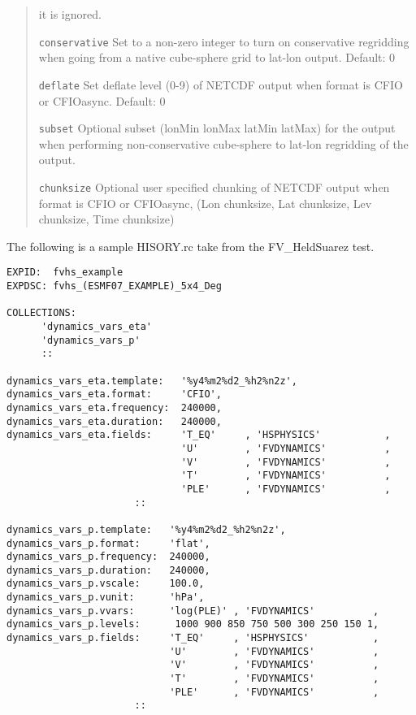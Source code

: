 \begin{quote}
\begin{trivlist}
                         it is ignored.
\item[\tt conservative]  Set to a non-zero integer to turn on conservative regridding when going
                         from a native cube-sphere grid to lat-lon output.
                         Default: 0
\item[\tt deflate]       Set deflate level (0-9) of NETCDF output when format is CFIO or CFIOasync.
                         Default: 0
\item[\tt subset]        Optional subset (lonMin lonMax latMin latMax) for the output when performing
                         non-conservative cube-sphere to lat-lon regridding of the output.
\item[\tt chunksize]     Optional user specified chunking of NETCDF output when format is CFIO or CFIOasync, 
                         (Lon chunksize, Lat chunksize, Lev chunksize, Time chunksize)
\end{trivlist}
\end{quote}

The following is a sample HISORY.rc take from the FV\_HeldSuarez test.
\begin{verbatim}
EXPID:  fvhs_example
EXPDSC: fvhs_(ESMF07_EXAMPLE)_5x4_Deg

COLLECTIONS:
      'dynamics_vars_eta'
      'dynamics_vars_p'
      ::

dynamics_vars_eta.template:   '%y4%m2%d2_%h2%n2z',
dynamics_vars_eta.format:     'CFIO',
dynamics_vars_eta.frequency:  240000,
dynamics_vars_eta.duration:   240000,
dynamics_vars_eta.fields:     'T_EQ'     , 'HSPHYSICS'           ,
                              'U'        , 'FVDYNAMICS'          ,
                              'V'        , 'FVDYNAMICS'          ,
                              'T'        , 'FVDYNAMICS'          ,
                              'PLE'      , 'FVDYNAMICS'          ,
                      ::

dynamics_vars_p.template:   '%y4%m2%d2_%h2%n2z',
dynamics_vars_p.format:     'flat',
dynamics_vars_p.frequency:  240000,
dynamics_vars_p.duration:   240000,
dynamics_vars_p.vscale:     100.0,
dynamics_vars_p.vunit:      'hPa',
dynamics_vars_p.vvars:      'log(PLE)' , 'FVDYNAMICS'          ,   
dynamics_vars_p.levels:      1000 900 850 750 500 300 250 150 1,
dynamics_vars_p.fields:     'T_EQ'     , 'HSPHYSICS'           ,
                            'U'        , 'FVDYNAMICS'          ,
                            'V'        , 'FVDYNAMICS'          ,
                            'T'        , 'FVDYNAMICS'          ,
                            'PLE'      , 'FVDYNAMICS'          ,
                      ::
\end{verbatim}

